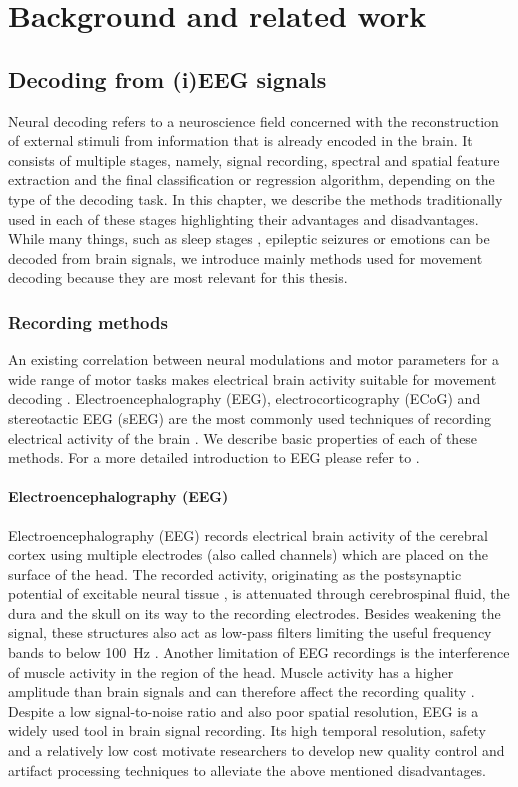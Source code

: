 \chapter{Background and related work}
\label{chap:background}
\section{Decoding from (i)EEG signals}
Neural decoding refers to a neuroscience field concerned with the reconstruction of external stimuli from information that is already encoded in the brain.
It consists of multiple stages, namely, signal recording, spectral and spatial feature extraction and the final classification or regression algorithm, depending on the type of the decoding task. 
In this chapter, we describe the methods traditionally used in each of these stages highlighting their advantages and disadvantages. 
While many things, such as sleep stages \cite{sleep-eegnet}, epileptic seizures \cite{epileptic-seizures-eeg} or emotions \cite{} can be decoded from brain signals, we introduce mainly methods used for movement decoding because they are most relevant for this thesis. 

\subsection{Recording methods}
An existing correlation between neural modulations and motor parameters for a wide range of motor tasks makes electrical brain activity suitable for movement decoding  \cite{lebedev-cortical-2005}.
Electroencephalography (EEG), electrocorticography (ECoG) and stereotactic EEG (sEEG) are the most commonly used techniques of recording electrical activity of the brain \cite{tam-human-2019}.
We describe basic properties of each of these methods. For a more detailed introduction to EEG please refer to \cite{NiedermeyersElectroencephalography}.

\subsubsection{Electroencephalography (EEG)}
Electroencephalography (EEG) records electrical brain activity of the cerebral cortex using multiple electrodes (also called channels) which are placed on the surface of the head. The recorded activity, originating as the postsynaptic potential of excitable neural tissue \cite{buzsaki-origin-2012}, is attenuated through cerebrospinal fluid, the dura and the skull on its way to the recording electrodes. Besides weakening the signal, these structures also act as low-pass filters limiting the useful frequency bands to below 100~Hz \cite{tam-human-2019}. Another limitation of EEG recordings is the interference of muscle activity in the region of the head. Muscle activity has a higher amplitude than brain signals and can therefore affect the recording quality \cite{scholg-presence-2002}. Despite a low signal-to-noise ratio and also poor spatial resolution, EEG is a widely used tool in brain signal recording. Its high temporal resolution, safety and a relatively low cost motivate researchers to develop new quality control and artifact processing techniques \cite{} to alleviate the above mentioned disadvantages. 

